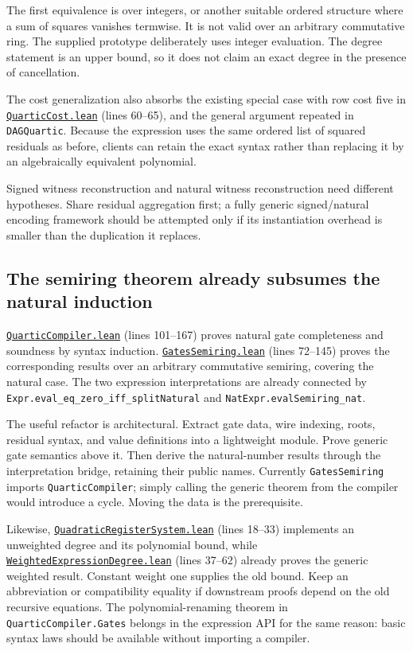 \documentclass[11pt,letterpaper]{article}
\newcommand{\code}[1]{\nolinkurl{#1}}
\newcommand{\src}[2]{\href{https://github.com/VladimirReshetnikov/ProveIt/blob/60e9c5d620c6c387d932876cfa2d9376f64ea56c/Computability/DiophantineConsistency/Lean/DiophantineConsistency/#1.lean}{\nolinkurl{#1.lean}} (lines #2)}
\begin{document}
The first equivalence is over integers, or another suitable ordered
structure where a sum of squares vanishes termwise. It is not valid over
an arbitrary commutative ring. The supplied prototype deliberately uses
integer evaluation. The degree statement is an upper bound, so it does
not claim an exact degree in the presence of cancellation.

The cost generalization also absorbs the existing special case with
row cost five in \src{QuarticCost}{60--65}, and the general argument
repeated in \code{DAGQuartic}. Because the expression uses the same
ordered list of squared residuals as before, clients can retain the exact
syntax rather than replacing it by an algebraically equivalent polynomial.

Signed witness reconstruction and natural witness reconstruction need
different hypotheses. Share residual aggregation first; a fully generic
signed/natural encoding framework should be attempted only if its
instantiation overhead is smaller than the duplication it replaces.

\subsection{The semiring theorem already subsumes the natural induction}

\src{QuarticCompiler}{101--167} proves natural gate completeness and
soundness by syntax induction. \src{GatesSemiring}{72--145} proves the
corresponding results over an arbitrary commutative semiring, covering
the natural case. The two expression interpretations are already
connected by \code{Expr.eval_eq_zero_iff_splitNatural} and
\code{NatExpr.evalSemiring_nat}.

The useful refactor is architectural. Extract gate data, wire indexing,
roots, residual syntax, and value definitions into a lightweight module.
Prove generic gate semantics above it. Then derive the natural-number
results through the interpretation bridge, retaining their public names.
Currently \code{GatesSemiring} imports \code{QuarticCompiler}; simply
calling the generic theorem from the compiler would introduce a cycle.
Moving the data is the prerequisite.

Likewise, \src{QuadraticRegisterSystem}{18--33} implements an
unweighted degree and its polynomial bound, while
\src{WeightedExpressionDegree}{37--62} already proves the generic
weighted result. Constant weight one supplies the old bound. Keep an
abbreviation or compatibility equality if downstream proofs depend on
the old recursive equations. The polynomial-renaming theorem in
\code{QuarticCompiler.Gates} belongs in the expression API for the same
reason: basic syntax laws should be available without importing a compiler.
\end{document}
